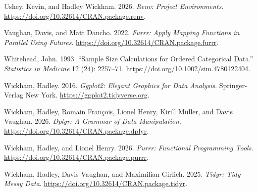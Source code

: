 \documentclass[
  man,
  floatsintext]{apa7}
\newlength{\cslhangindent}
\newenvironment{CSLReferences}[2] %
 {\begin{list}{}{%
  \setlength{\itemindent}{0pt}
  \setlength{\leftmargin}{0pt}
  \setlength{\parsep}{0pt}
  \ifodd #1
   \setlength{\leftmargin}{\cslhangindent}
   \setlength{\itemindent}{-1\cslhangindent}
  \fi
  \setlength{\itemsep}{#2\baselineskip}}}
 {\end{list}}
\begin{document}
\begin{CSLReferences}{1}{1}
Ushey, Kevin, and Hadley Wickham. 2026. \emph{Renv: Project
Environments}. \url{https://doi.org/10.32614/CRAN.package.renv}.

Vaughan, Davis, and Matt Dancho. 2022. \emph{Furrr: Apply Mapping
Functions in Parallel Using Futures}.
\url{https://doi.org/10.32614/CRAN.package.furrr}.

Whitehead, John. 1993. {``{Sample Size Calculations for Ordered
Categorical Data}.''} \emph{Statistics in Medicine} 12 (24): 2257--71.
\url{https://doi.org/10.1002/sim.4780122404}.

Wickham, Hadley. 2016. \emph{Ggplot2: Elegant Graphics for Data
Analysis}. Springer-Verlag New York.
\url{https://ggplot2.tidyverse.org}.

Wickham, Hadley, Romain François, Lionel Henry, Kirill Müller, and Davis
Vaughan. 2026. \emph{Dplyr: A Grammar of Data Manipulation}.
\url{https://doi.org/10.32614/CRAN.package.dplyr}.

Wickham, Hadley, and Lionel Henry. 2026. \emph{Purrr: Functional
Programming Tools}. \url{https://doi.org/10.32614/CRAN.package.purrr}.

Wickham, Hadley, Davis Vaughan, and Maximilian Girlich. 2025.
\emph{Tidyr: Tidy Messy Data}.
\url{https://doi.org/10.32614/CRAN.package.tidyr}.

\end{CSLReferences}
\end{document}
